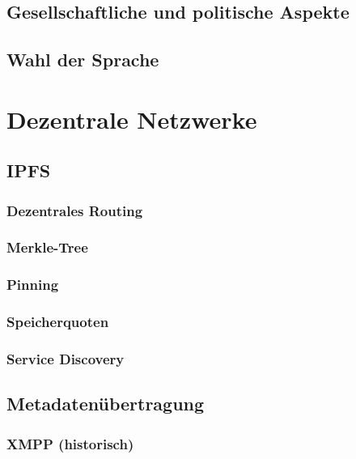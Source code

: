 \documentclass[11pt,ngerman,toc=listof,index=totoc]{scrreprt}
\begin{document}
\section{Gesellschaftliche und politische
Aspekte}\label{gesellschaftliche-und-politische-aspekte}

\section{Wahl der Sprache}\label{wahl-der-sprache}

\chapter{Dezentrale Netzwerke}\label{dezentrale-netzwerke}

\section{IPFS}\label{ipfs}

\subsection{Dezentrales Routing}\label{dezentrales-routing}

\subsection{Merkle-Tree}\label{merkle-tree}

\subsection{Pinning}\label{pinning}

\subsection{Speicherquoten}\label{speicherquoten}

\subsection{Service Discovery}\label{service-discovery}

\section{Metadatenübertragung}\label{metadatenuxfcbertragung}

\subsection{XMPP (historisch)}\label{xmpp-historisch}
\end{document}
